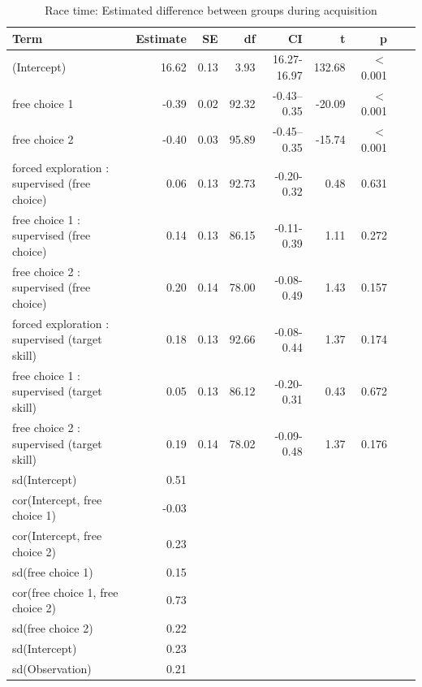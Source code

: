 \documentclass[pdflatex,sn-nature]{sn-jnl}%
\theoremstyle{thmstyleone}%
\theoremstyle{thmstyletwo}%
\theoremstyle{thmstylethree}%
\begin{document}
\begin{appendices}
\begin{table}[p]
\caption{Race time: Estimated difference between groups during acquisition}\label{table_racetime_acquisition_groupdifference}
\centering
\begin{tabular}{lrrrrrrrr}
  \hline
 Term & Estimate & SE & df & CI & t & p \\ 
  \hline
 (Intercept) & 16.62 & 0.13 & 3.93 & 16.27-16.97 & 132.68 &  $<$  0.001 \\ 
 free choice 1 & -0.39 & 0.02 & 92.32 & -0.43--0.35 & -20.09 &  $<$  0.001 \\ 
  free choice 2 & -0.40 & 0.03 & 95.89 & -0.45--0.35 & -15.74 &  $<$  0.001 \\ 
  forced exploration : supervised (free choice) & 0.06 & 0.13 & 92.73 & -0.20-0.32 & 0.48 &    0.631 \\ 
  free choice 1 : supervised (free choice) & 0.14 & 0.13 & 86.15 & -0.11-0.39 & 1.11 &   0.272 \\ 
  free choice 2 : supervised (free choice) & 0.20 & 0.14 & 78.00 & -0.08-0.49 & 1.43 &   0.157 \\ 
  forced exploration : supervised (target skill) & 0.18 & 0.13 & 92.66 & -0.08-0.44 & 1.37 &   0.174 \\ 
  free choice 1 : supervised (target skill) & 0.05 & 0.13 & 86.12 & -0.20-0.31 & 0.43 &   0.672 \\ 
  free choice 2 : supervised (target skill) & 0.19 & 0.14 & 78.02 & -0.09-0.48 & 1.37 &   0.176 \\ 
  sd(Intercept) & 0.51 &  &  &  &  &    \\ 
  cor(Intercept, free choice 1) & -0.03 &  &  &  &  &    \\ 
  cor(Intercept, free choice 2) & 0.23 &  &  &  &  &    \\ 
  sd(free choice 1) & 0.15 &  &  &  &  &    \\ 
  cor(free choice 1, free choice 2) & 0.73 &  &  &  &  &   \\ 
  sd(free choice 2) & 0.22 &  &  &  &  &    \\ 
  sd(Intercept) & 0.23 &  &  &  &  &   \\ 
  sd(Observation) & 0.21 &  &  &  &   &  \\ 
   \hline
\end{tabular}
\end{table}




\end{appendices}
\end{document}
